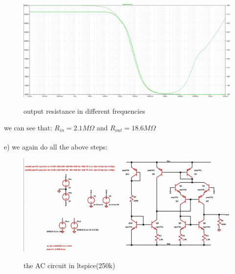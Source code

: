\documentclass[11pt]{article}
\begin{document}
\begin{figure}[H]
    \begin{center}
        \includegraphics[scale=0.45]{Fig/ac-outR.png}
        \label{fig:ACoutR}
        \caption{output resistance in different frequencies}
    \end{center}
\end{figure}
we can see that: $R_{in} = 2.1M\Omega$ and $R_{out} = 18.6M\Omega$ \\ \\

e) we again do all the above steps:
\begin{figure}[H]
    \begin{center}
        \includegraphics[scale=0.4]{Fig/ac-circuit250.png}
        \label{fig:ACCircuit250}
        \caption{the AC circuit in ltspice(250k)}
    \end{center}
\end{figure}
\end{document}
